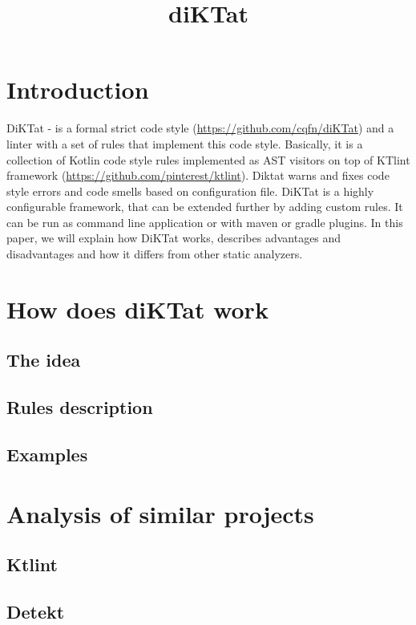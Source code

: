 \documentclass{article}
\title{diKTat}
\begin{document}
\maketitle

\newpage

\tableofcontents

\newpage

\section{Introduction}
\par
DiKTat - is a formal strict code style (\url{https://github.com/cqfn/diKTat}) and a linter with a set of rules that implement this code style. Basically, it is a collection of Kotlin code style rules implemented as AST visitors on top of KTlint framework (\url{https://github.com/pinterest/ktlint}). Diktat warns and fixes code style errors and code smells based on configuration file. DiKTat is a highly configurable framework, that can be extended further by adding custom rules. It can be run as command line application or with maven or gradle plugins. In this paper, we will explain how DiKTat works, describes advantages and disadvantages and how it differs from other static analyzers.

\newpage

\section{How does diKTat work}
\subsection{The idea}
\subsection{Rules description}
\subsection{Examples}

\newpage

\section{Analysis of similar projects}
\subsection{Ktlint}
\subsection{Detekt}
\newpage
\end{document}

